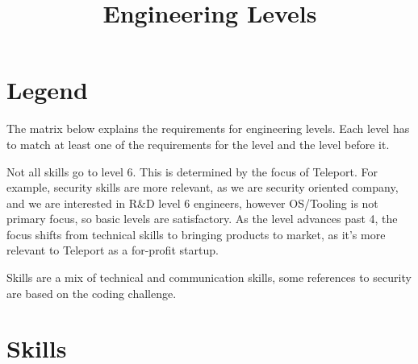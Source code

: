 \documentclass{article}
\begin{document}
 
\title{Engineering Levels}

\section{Legend}
 
The matrix below explains the requirements for engineering levels. Each level has to match at least one of the requirements for the level and the level before it.

Not all skills go to level 6. This is determined by the focus of Teleport.
For example, security skills are more relevant, as we are security oriented company, and we are interested in R\&D level 6 engineers, however OS/Tooling is not primary focus, so basic levels are satisfactory.
As the level advances past 4, the focus shifts from technical skills to bringing products to market, as it's more relevant to Teleport as a for-profit startup.

Skills are a mix of technical and communication skills, some references to security are based on the coding challenge.

\section{Skills}
    
\end{document}
